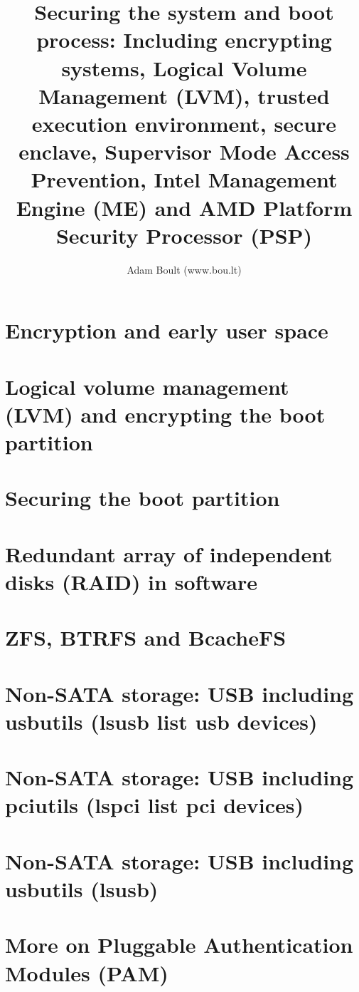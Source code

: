 \documentclass[oneside]{book}
\begin{document}
\author{Adam Boult (www.bou.lt)}
\title{Securing the system and boot process: Including encrypting systems, Logical Volume Management (LVM), trusted execution environment, secure enclave, Supervisor Mode Access Prevention, Intel Management Engine (ME) and AMD Platform Security Processor (PSP)}
\maketitle

\setcounter{tocdepth}{0}
\tableofcontents



\part{Encryption and early user space}




\part{Logical volume management (LVM) and encrypting the boot partition}


\part{Securing the boot partition}



\part{Redundant array of independent disks (RAID) in software}


\part{ZFS, BTRFS and BcacheFS}




\part{Non-SATA storage: USB including usbutils (lsusb list usb devices)}
\part{Non-SATA storage: USB including pciutils (lspci list pci devices)}
\part{Non-SATA storage: USB including usbutils (lsusb)}


\part{More on Pluggable Authentication Modules (PAM)}

\end{document}
